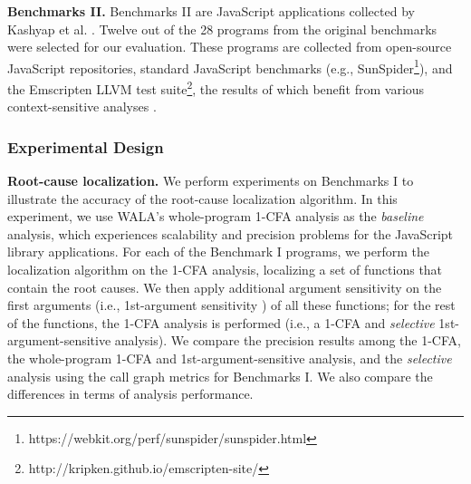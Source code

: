 {\bf Benchmarks II.} Benchmarks II are JavaScript applications collected by Kashyap et al. \cite{Kashyap:2014:JSA:2635868.2635904}. Twelve out of the 28 programs from the original benchmarks were selected for our evaluation. These programs are collected from open-source JavaScript repositories, standard JavaScript benchmarks (e.g., SunSpider\footnote{https://webkit.org/perf/sunspider/sunspider.html}), and the Emscripten LLVM test suite\footnote{http://kripken.github.io/emscripten-site/}, the results of which benefit from various context-sensitive analyses \cite{Kashyap:2014:JSA:2635868.2635904,DBLP:conf/ecoop/WeiR15}.

\subsubsection{Experimental Design} 

{\bf Root-cause localization.} We perform experiments on Benchmarks I to illustrate the accuracy of the root-cause localization algorithm. In this experiment, we use WALA's whole-program 1-CFA analysis as the {\it baseline} analysis, which experiences scalability and precision problems for the JavaScript library applications. For each of the Benchmark I programs, we perform the localization algorithm on the 1-CFA analysis, localizing a set of functions that contain the root causes. We then apply additional argument sensitivity on the first arguments (i.e., 1st-argument sensitivity \cite{DBLP:conf/ecoop/WeiR15}) of all these functions; for the rest of the functions, the 1-CFA analysis is performed (i.e., a 1-CFA and {\it selective} 1st-argument-sensitive analysis). We compare the precision results among the 1-CFA, the whole-program 1-CFA and 1st-argument-sensitive analysis, and the {\it selective} analysis using the call graph metrics for Benchmarks I. We also compare the differences in terms of analysis performance.


